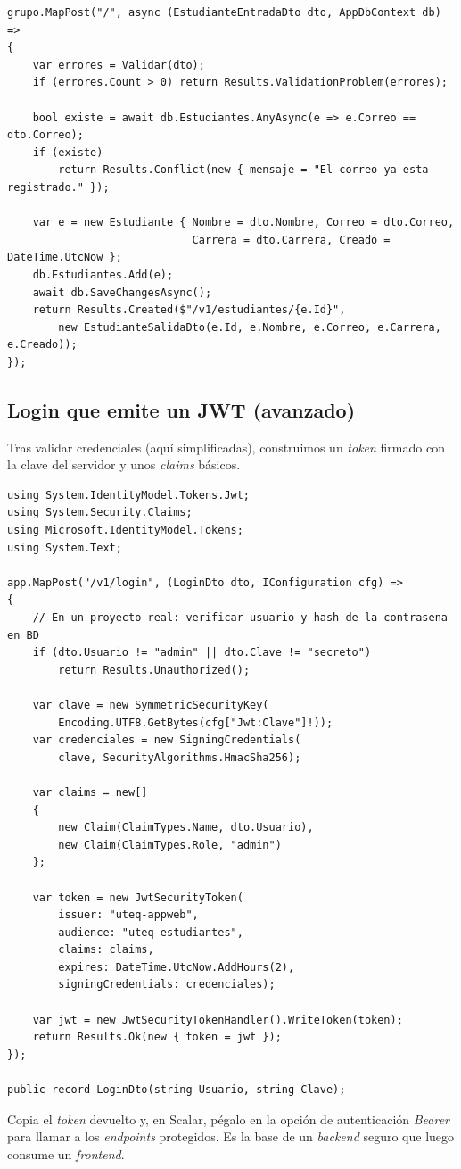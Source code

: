 \documentclass[11pt]{article}
\begin{document}
\begin{cajacodigo}
\begin{lstlisting}[style=cs]
grupo.MapPost("/", async (EstudianteEntradaDto dto, AppDbContext db) =>
{
    var errores = Validar(dto);
    if (errores.Count > 0) return Results.ValidationProblem(errores);

    bool existe = await db.Estudiantes.AnyAsync(e => e.Correo == dto.Correo);
    if (existe)
        return Results.Conflict(new { mensaje = "El correo ya esta registrado." });

    var e = new Estudiante { Nombre = dto.Nombre, Correo = dto.Correo,
                             Carrera = dto.Carrera, Creado = DateTime.UtcNow };
    db.Estudiantes.Add(e);
    await db.SaveChangesAsync();
    return Results.Created($"/v1/estudiantes/{e.Id}",
        new EstudianteSalidaDto(e.Id, e.Nombre, e.Correo, e.Carrera, e.Creado));
});
\end{lstlisting}
\end{cajacodigo}

\subsection{Login que emite un JWT (avanzado)}
Tras validar credenciales (aquí simplificadas), construimos un \emph{token} firmado con la clave del servidor y unos \emph{claims} básicos.

\begin{cajacodigo}
\begin{lstlisting}[style=cs]
using System.IdentityModel.Tokens.Jwt;
using System.Security.Claims;
using Microsoft.IdentityModel.Tokens;
using System.Text;

app.MapPost("/v1/login", (LoginDto dto, IConfiguration cfg) =>
{
    // En un proyecto real: verificar usuario y hash de la contrasena en BD
    if (dto.Usuario != "admin" || dto.Clave != "secreto")
        return Results.Unauthorized();

    var clave = new SymmetricSecurityKey(
        Encoding.UTF8.GetBytes(cfg["Jwt:Clave"]!));
    var credenciales = new SigningCredentials(
        clave, SecurityAlgorithms.HmacSha256);

    var claims = new[]
    {
        new Claim(ClaimTypes.Name, dto.Usuario),
        new Claim(ClaimTypes.Role, "admin")
    };

    var token = new JwtSecurityToken(
        issuer: "uteq-appweb",
        audience: "uteq-estudiantes",
        claims: claims,
        expires: DateTime.UtcNow.AddHours(2),
        signingCredentials: credenciales);

    var jwt = new JwtSecurityTokenHandler().WriteToken(token);
    return Results.Ok(new { token = jwt });
});

public record LoginDto(string Usuario, string Clave);
\end{lstlisting}
\end{cajacodigo}
\vspace{2pt}
Copia el \emph{token} devuelto y, en Scalar, pégalo en la opción de autenticación \emph{Bearer} para llamar a los \emph{endpoints} protegidos. Es la base de un \emph{backend} seguro que luego consume un \emph{frontend}.
\end{document}
